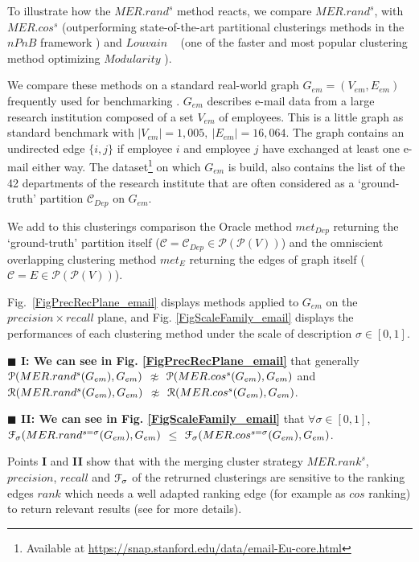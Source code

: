 \documentclass[12pt]{article}
\theoremstyle{thmstyleone}%
\theoremstyle{definition}
\begin{document}
To illustrate how the $MER.rand^{s}$ method reacts, we compare $MER.rand^{s}$, with $MER.cos^{s}$ (outperforming state-of-the-art partitional clusterings methods in the $nPnB$ framework \cite{Gaume_BEC1_2025}) and $Louvain$ ~\cite{1742-5468-2008-10-P10008} (one of the faster and most popular clustering method optimizing $Modularity$ \cite{Newman_2004}).

We compare these methods on a standard real-world graph $G_{em}=(V_{em},E_{em})$ frequently used for benchmarking \cite{10.1145/3097983.3098069}. $G_{em}$ describes e-mail data from a large research institution composed of a set $V_{em}$ of employees. This is a little graph as standard benchmark with $|V_{em}|=1,005,~|E_{em}|=16,064$. The graph contains an undirected edge $\{i,j\}$ if employee $i$ and employee $j$ have exchanged at least one e-mail either way.
The dataset\footnote{Available at \url{https://snap.stanford.edu/data/email-Eu-core.html}} on which $G_{em}$ is build, also contains the list of the 42 departments of the research institute that are often considered as a `ground-truth' partition $\mathcal{C}_{Dep}$ on $G_{em}$.

We add to this clusterings comparison the Oracle method $met_{Dep}$ returning the `ground-truth' partition itself ($\mathcal{C}=\mathcal{C}_{Dep} \in \mathcal{P}(\mathcal{P}(V))$) and the omniscient overlapping clustering method $met_{E}$ returning the edges of graph itself ($\mathcal{C}=E \in \mathcal{P}(\mathcal{P}(V))$).

Fig.~\ref{FigPrecRecPlane_email} displays methods applied to $G_{em}$ on the $precision \times recall$ plane, and Fig. \ref{FigScaleFamily_email} displays the performances of each clustering method under the scale of description $\sigma \in [0,1]$.

\noindent
{\bf $\blacksquare$ I: We can see in Fig. \ref{FigPrecRecPlane_email}} that generally
$\EuScript{P}(MER.rand^{s}(G_{em}), G_{em})$ $\not\approx$ $\EuScript{P}(MER.cos^{s}(G_{em}), G_{em})$ and $\EuScript{R}(MER.rand^{s}(G_{em}), G_{em})$ $\not\approx$ $\EuScript{R}(MER.cos^{s}(G_{em}), G_{em})$.

\noindent
{\bf $\blacksquare$ II: We can see in Fig. \ref{FigScaleFamily_email}} that
$\forall \sigma \in [0,1]$, $\EuScript{F}_{\sigma}(MER.rand^{s=\sigma}(G_{em}), G_{em})$ $\leqslant$
%
$\EuScript{F}_{\sigma}(MER.cos^{s=\sigma}(G_{em}), G_{em})$.

\noindent
Points {\bf I} and {\bf II} show that with the merging cluster strategy $MER.rank^{s}$, $precision$, $recall$ and $\EuScript{F}_{\sigma}$ of the retrurned clusterings are sensitive to the ranking edges $rank$ which needs a well adapted ranking edge (for example as $cos$ ranking) to return relevant results (see \cite{Gaume_BEC1_2025} for more details).
\end{document}

